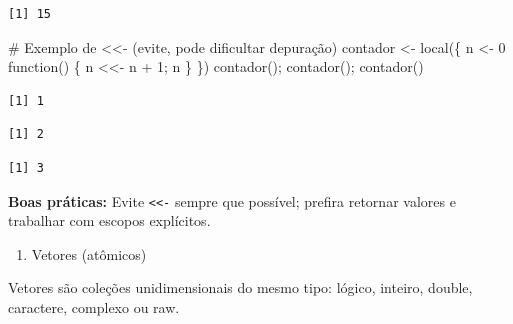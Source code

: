 \documentclass[
  letterpaper,
  DIV=11,
  numbers=noendperiod]{scrreprt}
\newenvironment{Shaded}{\begin{snugshade}}{\end{snugshade}}
\newcommand{\CommentTok}[1]{\textcolor[rgb]{0.37,0.37,0.37}{#1}}
\newcommand{\ControlFlowTok}[1]{\textcolor[rgb]{0.00,0.23,0.31}{#1}}
\newcommand{\DecValTok}[1]{\textcolor[rgb]{0.68,0.00,0.00}{#1}}
\newcommand{\FunctionTok}[1]{\textcolor[rgb]{0.28,0.35,0.67}{#1}}
\newcommand{\NormalTok}[1]{\textcolor[rgb]{0.00,0.23,0.31}{#1}}
\newcommand{\OtherTok}[1]{\textcolor[rgb]{0.00,0.23,0.31}{#1}}
\newcommand{\SpecialCharTok}[1]{\textcolor[rgb]{0.37,0.37,0.37}{#1}}
\providecommand{\tightlist}{%
  \setlength{\itemsep}{0pt}\setlength{\parskip}{0pt}}\usepackage{longtable,booktabs,array}
\begin{document}
\begin{verbatim}
[1] 15
\end{verbatim}

\begin{Shaded}
\begin{Highlighting}[]
\CommentTok{\# Exemplo de \textless{}\textless{}{-} (evite, pode dificultar depuração)}
\NormalTok{contador }\OtherTok{\textless{}{-}} \FunctionTok{local}\NormalTok{(\{}
\NormalTok{  n }\OtherTok{\textless{}{-}} \DecValTok{0}
  \ControlFlowTok{function}\NormalTok{() \{ n }\OtherTok{\textless{}\textless{}{-}}\NormalTok{ n }\SpecialCharTok{+} \DecValTok{1}\NormalTok{; n \}}
\NormalTok{\})}
\FunctionTok{contador}\NormalTok{(); }\FunctionTok{contador}\NormalTok{(); }\FunctionTok{contador}\NormalTok{()}
\end{Highlighting}
\end{Shaded}

\begin{verbatim}
[1] 1
\end{verbatim}

\begin{verbatim}
[1] 2
\end{verbatim}

\begin{verbatim}
[1] 3
\end{verbatim}

\begin{tcolorbox}[enhanced jigsaw, left=2mm, toprule=.15mm, opacityback=0, title=\textcolor{quarto-callout-warning-color}{\faExclamationTriangle}\hspace{0.5em}{Aviso}, leftrule=.75mm, breakable, colbacktitle=quarto-callout-warning-color!10!white, coltitle=black, rightrule=.15mm, bottomtitle=1mm, toptitle=1mm, colframe=quarto-callout-warning-color-frame, colback=white, opacitybacktitle=0.6, bottomrule=.15mm, arc=.35mm, titlerule=0mm]

\textbf{Boas práticas:} Evite \texttt{\textless{}\textless{}-} sempre
que possível; prefira retornar valores e trabalhar com escopos
explícitos.

\end{tcolorbox}

\begin{enumerate}
\def\labelenumi{\arabic{enumi})}
\setcounter{enumi}{3}
\tightlist
\item
  Vetores (atômicos)
\end{enumerate}

Vetores são coleções unidimensionais do mesmo tipo: lógico, inteiro,
double, caractere, complexo ou raw.
\end{document}
